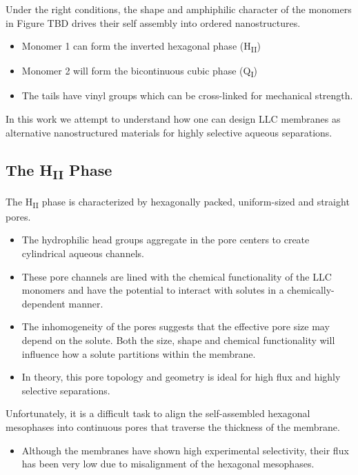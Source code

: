   Under the right conditions, the shape and amphiphilic character of the monomers in 
  Figure TBD drives their self assembly into ordered nanostructures.
  \begin{itemize}
    \item Monomer 1 can form the inverted hexagonal phase (H\textsubscript{II})
    \item Monomer 2 will form the bicontinuous cubic phase (Q\textsubscript{I})
    \item The tails have vinyl groups which can be cross-linked for mechanical strength.
  \end{itemize}
  

  In this work we attempt to understand how one can design LLC membranes as 
  alternative nanostructured materials for highly selective aqueous separations.
  
  \subsection{The H\textsubscript{II} Phase}
   
  The H\textsubscript{II} phase is characterized by hexagonally packed, uniform-sized
  and straight pores.
  \begin{itemize}
    \item The hydrophilic head groups aggregate in the pore centers to create
    cylindrical aqueous channels. 
    \item These pore channels are lined with the chemical functionality of the LLC monomers
    and have the potential to interact with solutes in a chemically-dependent manner.
    \item The inhomogeneity of the pores suggests that the effective pore size may depend
    on the solute. Both the size, shape and chemical functionality will influence
    how a solute partitions within the membrane. %
    \item In theory, this pore topology and geometry is ideal for high flux and 
    highly selective separations.
  \end{itemize}
  
  Unfortunately, it is a difficult task to align the self-assembled hexagonal
  mesophases into continuous pores that traverse the thickness of the membrane.
  \begin{itemize}
    \item Although the membranes have shown high experimental selectivity, their 
    flux has been very low due to misalignment of the hexagonal mesophases.
  \end{itemize}
  
